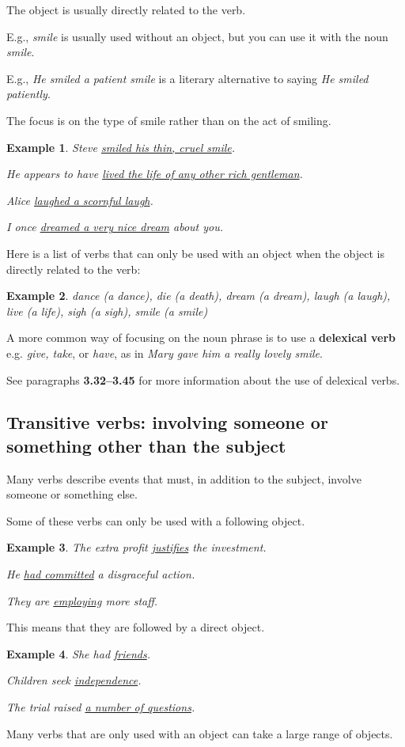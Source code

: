 \documentclass[oneside]{book}
\numberwithin{equation}{section}
\newtheorem{example}{Example}[section]
\begin{document}
The object is usually directly related to the verb.

E.g., \textit{smile} is usually used without an object, but you can use it with the noun \textit{smile}.

E.g., \textit{He smiled a patient smile} is a literary alternative to saying \textit{He smiled patiently}.

The focus is on the type of smile rather than on the act of smiling.
\begin{example}
    Steve \underline{smiled his thin, cruel smile}.
    
    He appears to have \underline{lived the life of any other rich gentleman}.
    
    Alice \underline{laughed a scornful laugh}.
    
    I once \underline{dreamed a very nice dream} about you.
\end{example}
Here is a list of verbs that can only be used with an object when the object is directly related to the verb:
\begin{example}
    dance (a dance), die (a death), dream (a dream), laugh (a laugh), live (a life), sigh (a sigh), smile (a smile)
\end{example}
A more common way of focusing on the noun phrase is to use a \textbf{delexical verb} e.g. \textit{give, take}, or \textit{have}, as in \textit{Mary gave him a really lovely smile}.

See paragraphs \textbf{3.32--3.45} for more information about the use of delexical verbs.

\subsection{Transitive verbs: involving someone or something other than the subject}
\noindent{} Many verbs describe events that must, in addition to the subject, involve someone or something else.

Some of these verbs can only be used with a following object.
\begin{example}
    The extra profit \underline{justifies} the investment.
    
    He \underline{had committed} a disgraceful action.
    
    They are \underline{employing} more staff.
\end{example}
This means that they are followed by a direct object.
\begin{example}
    She had \underline{friends}.
    
    Children seek \underline{independence}.
    
    The trial raised \underline{a number of questions}.
\end{example}
%
\noindent{} Many verbs that are only used with an object can take a large range of objects.
\end{document}
